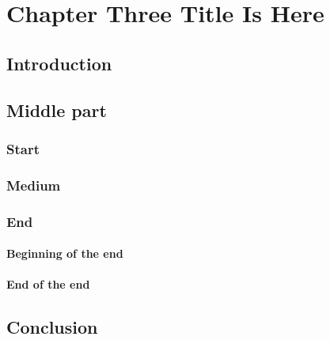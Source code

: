 \chapter[Chapter title]{Chapter Three Title Is Here}

\section{Introduction}
\lipsum[1-3]

\section{Middle part}
\lipsum[10]
\subsection{Start}
\lipsum[1-2]
\subsection{Medium}
\lipsum[1-3]
\subsection{End}
\lipsum[11-12]
\subsubsection{Beginning of the end}
\lipsum[14]
\subsubsection{End of the end}
\lipsum[15]

\section{Conclusion}
\lipsum[5-8]